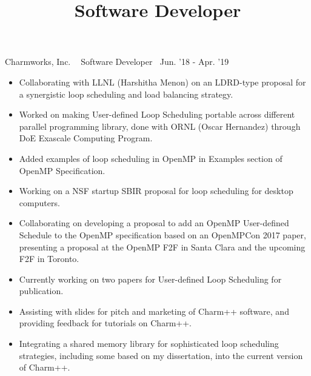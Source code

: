 \title{Software Developer}
{Charmworks, Inc. $\>$$\>$$\>$$\>$Software Developer$\>$$\>$$\>$$\>$Jun. '18 - Apr. '19}
\vspace{0.0in}
\begin{itemize}
\item Collaborating with LLNL (Harshitha Menon) on an LDRD-type proposal for a synergistic loop scheduling and load balancing strategy. 
\item Worked on making User-defined Loop Scheduling portable across different parallel programming library, done with ORNL (Oscar Hernandez) through DoE Exascale Computing Program.
\item Added examples of loop scheduling in OpenMP in Examples section of OpenMP Specification.
\item Working on a NSF startup SBIR proposal for loop scheduling for desktop computers. 
\item Collaborating on developing a proposal to add an OpenMP User-defined Schedule to the OpenMP specification based on an OpenMPCon 2017 paper, presenting a proposal at the OpenMP F2F in Santa Clara and the upcoming F2F in Toronto.
\item Currently working on two papers for User-defined Loop Scheduling for publication.
\item Assisting with slides for pitch and marketing of Charm++ software, and providing feedback for tutorials on Charm++.
\item Integrating a shared memory library for sophisticated loop scheduling strategies, including some based on my dissertation, into the current version of Charm++.
\end{itemize}

